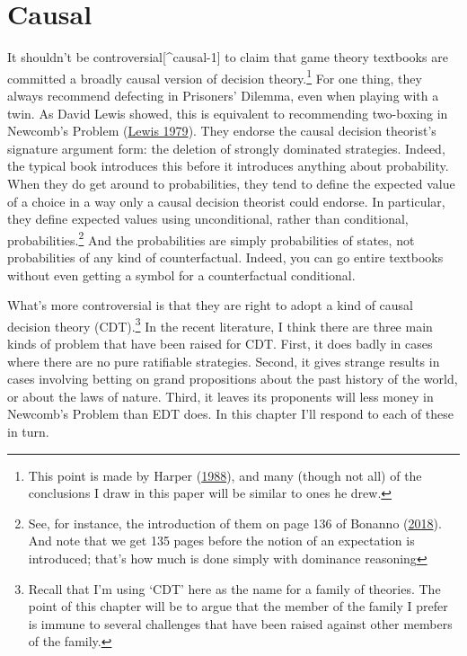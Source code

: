 \documentclass[
  12pt,
  letterpaper,
  DIV=11,
  numbers=noendperiod]{scrreprt}
\begin{document}

\hypertarget{sec-causal}{%
\chapter{Causal}\label{sec-causal}}

It shouldn't be controversial{[}\^{}causal-1{]} to claim that game
theory textbooks are committed a broadly causal version of decision
theory.\footnote{This point is made by Harper
  (\protect\hyperlink{ref-Harper1988}{1988}), and many (though not all)
  of the conclusions I draw in this paper will be similar to ones he
  drew.} For one thing, they always recommend defecting in Prisoners'
Dilemma, even when playing with a twin. As David Lewis showed, this is
equivalent to recommending two-boxing in Newcomb's Problem
(\protect\hyperlink{ref-Lewis1979e}{Lewis 1979}). They endorse the
causal decision theorist's signature argument form: the deletion of
strongly dominated strategies. Indeed, the typical book introduces this
before it introduces anything about probability. When they do get around
to probabilities, they tend to define the expected value of a choice in
a way only a causal decision theorist could endorse. In particular, they
define expected values using unconditional, rather than conditional,
probabilities.\footnote{See, for instance, the introduction of them on
  page 136 of Bonanno (\protect\hyperlink{ref-Bonanno2018}{2018}). And
  note that we get 135 pages before the notion of an expectation is
  introduced; that's how much is done simply with dominance reasoning}
And the probabilities are simply probabilities of states, not
probabilities of any kind of counterfactual. Indeed, you can go entire
textbooks without even getting a symbol for a counterfactual
conditional.

What's more controversial is that they are right to adopt a kind of
causal decision theory (CDT).\footnote{Recall that I'm using `CDT' here
  as the name for a family of theories. The point of this chapter will
  be to argue that the member of the family I prefer is immune to
  several challenges that have been raised against other members of the
  family.} In the recent literature, I think there are three main kinds
of problem that have been raised for CDT. First, it does badly in cases
where there are no pure ratifiable strategies. Second, it gives strange
results in cases involving betting on grand propositions about the past
history of the world, or about the laws of nature. Third, it leaves its
proponents will less money in Newcomb's Problem than EDT does. In this
chapter I'll respond to each of these in turn.
\end{document}
